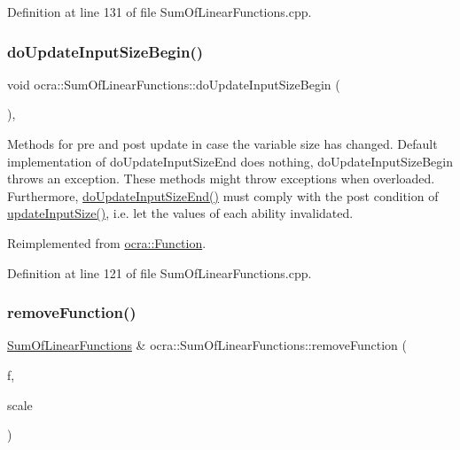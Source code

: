 Definition at line 131 of file Sum\+Of\+Linear\+Functions.\+cpp.

\hypertarget{classocra_1_1SumOfLinearFunctions_a7cfc7b9339509922c2ea6173d4d4d141}{}\label{classocra_1_1SumOfLinearFunctions_a7cfc7b9339509922c2ea6173d4d4d141} 
\subsubsection{\texorpdfstring{do\+Update\+Input\+Size\+Begin()}{doUpdateInputSizeBegin()}}
{\footnotesize\ttfamily void ocra\+::\+Sum\+Of\+Linear\+Functions\+::do\+Update\+Input\+Size\+Begin (\begin{DoxyParamCaption}{ }\end{DoxyParamCaption})\hspace{0.3cm}{\ttfamily [protected]}, {\ttfamily [virtual]}}

Methods for pre and post update in case the variable size has changed. Default implementation of do\+Update\+Input\+Size\+End does nothing, do\+Update\+Input\+Size\+Begin throws an exception. These methods might throw exceptions when overloaded. Furthermore, {\ttfamily \hyperlink{classocra_1_1LinearFunction_ac6bdf62ad6634397778d5f4223ed6d82}{do\+Update\+Input\+Size\+End()}} must comply with the post condition of {\ttfamily \hyperlink{classocra_1_1Function_a3a5b9e6ae296339acc87ab2cbf97ef98}{update\+Input\+Size()}}, i.\+e. let the values of each ability invalidated. 

Reimplemented from \hyperlink{classocra_1_1Function_a3f728f3758e6448aa59932853db5ddcc}{ocra\+::\+Function}.



Definition at line 121 of file Sum\+Of\+Linear\+Functions.\+cpp.

\hypertarget{classocra_1_1SumOfLinearFunctions_a2d3525455d1f4d2c19c7a72a33d1d600}{}\label{classocra_1_1SumOfLinearFunctions_a2d3525455d1f4d2c19c7a72a33d1d600} 
\subsubsection{\texorpdfstring{remove\+Function()}{removeFunction()}\hspace{0.1cm}{\footnotesize\ttfamily [1/2]}}
{\footnotesize\ttfamily \hyperlink{classocra_1_1SumOfLinearFunctions}{Sum\+Of\+Linear\+Functions} \& ocra\+::\+Sum\+Of\+Linear\+Functions\+::remove\+Function (\begin{DoxyParamCaption}\item[{\hyperlink{classocra_1_1LinearFunction}{Linear\+Function} \&}]{f,  }\item[{double}]{scale }\end{DoxyParamCaption})}



